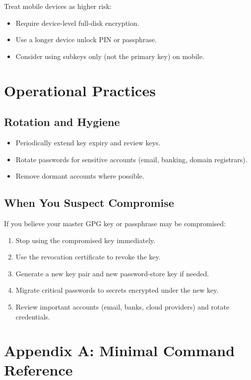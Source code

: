 \documentclass[11pt,a4paper]{article}
\begin{document}
Treat mobile devices as higher risk:

\begin{itemize}[noitemsep]
  \item Require device-level full-disk encryption.
  \item Use a longer device unlock PIN or passphrase.
  \item Consider using subkeys only (not the primary key) on mobile.
\end{itemize}

\section{Operational Practices}

\subsection{Rotation and Hygiene}

\begin{itemize}[noitemsep]
  \item Periodically extend key expiry and review keys.
  \item Rotate passwords for sensitive accounts (email, banking, domain registrars).
  \item Remove dormant accounts where possible.
\end{itemize}

\subsection{When You Suspect Compromise}

If you believe your master GPG key or passphrase may be compromised:

\begin{enumerate}[noitemsep]
  \item Stop using the compromised key immediately.
  \item Use the revocation certificate to revoke the key.
  \item Generate a new key pair and new password-store key if needed.
  \item Migrate critical passwords to secrets encrypted under the new key.
  \item Review important accounts (email, banks, cloud providers) and rotate credentials.
\end{enumerate}

\section{Appendix A: Minimal Command Reference}
\end{document}
